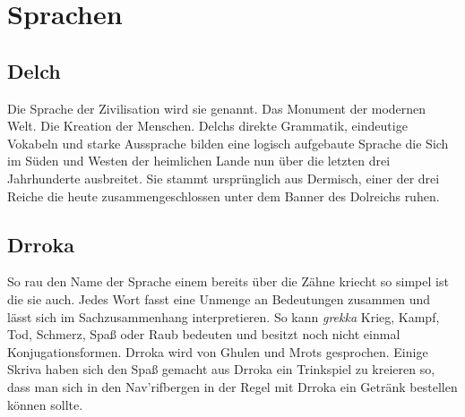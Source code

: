     \section{Sprachen}
    
    \subsection*{Delch}
    Die Sprache der Zivilisation wird sie genannt. Das Monument der modernen Welt. Die Kreation der Menschen. Delchs direkte Grammatik, eindeutige Vokabeln und starke Aussprache bilden eine logisch aufgebaute Sprache die Sich im Süden und Westen der heimlichen Lande nun über die letzten drei Jahrhunderte ausbreitet. Sie stammt ursprünglich aus Dermisch, einer der drei Reiche die heute zusammengeschlossen unter dem Banner des Dolreichs ruhen.
    
    \subsection*{Drroka}
    So rau den Name der Sprache einem bereits über die Zähne kriecht so simpel ist die sie auch. Jedes Wort fasst eine Unmenge an Bedeutungen zusammen und lässt sich im Sachzusammenhang interpretieren. So kann \textit{grekka} Krieg, Kampf, Tod, Schmerz, Spaß oder Raub bedeuten und besitzt noch nicht einmal Konjugationsformen. Drroka wird von Ghulen und Mrots gesprochen. Einige Skriva haben sich den Spaß gemacht aus Drroka ein Trinkspiel zu kreieren so, dass man sich in den Nav'rifbergen in der Regel mit Drroka ein Getränk bestellen können sollte.